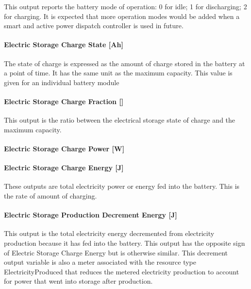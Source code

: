 This output reports the battery mode of operation: 0 for idle; 1 for discharging; 2 for charging. It is expected that more operation modes would be added when a smart and active power dispatch controller is used in future.

\paragraph{Electric Storage Charge State {[}Ah{]}}\label{electric-storage-charge-state-ah}

The state of charge is expressed as the amount of charge stored in the battery at a point of time. It has the same unit as the maximum capacity. This value is given for an individual battery module

\paragraph{Electric Storage Charge Fraction {[]}}\label{electric-storage-charge-fraction}

This output is the ratio between the electrical storage state of charge and the maximum capacity.

\paragraph{Electric Storage Charge Power {[}W{]}}\label{electric-storage-charge-power-w-1}

\paragraph{Electric Storage Charge Energy {[}J{]}}\label{electric-storage-charge-energy-j-1}

These outputs are total electricity power or energy fed into the battery. This is the rate of amount of charging.

\paragraph{Electric Storage Production Decrement Energy {[}J{]}}\label{electric-storage-production-decrement-energy-j-1}

This output is the total electricity energy decremented from electricity production because it has fed into the battery. This output has the opposite sign of Electric Storage Charge Energy but is otherwise similar. This decrement output variable is also a meter associated with the resource type ElectricityProduced that reduces the metered electricity production to account for power that went into storage after production.

